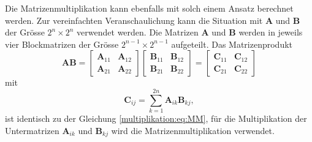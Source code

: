 Die Matrizenmultiplikation kann ebenfalls mit solch einem Ansatz berechnet werden.
Zur vereinfachten Veranschaulichung kann die Situation mit $\mathbf{A}$ und $\mathbf{B}$ der Gr\"osse $2^n \times 2^n$ verwendet werden.
Die Matrizen $\mathbf{A}$ und $\mathbf{B}$ werden in jeweils vier Blockmatrizen der Gr\"osse $2^{n-1} \times 2^{n-1}$ aufgeteilt.
Das Matrizenprodukt
\begin{equation}
\mathbf{A}\mathbf{B}=
\begin{bmatrix}
\mathbf{A}_{11} & \mathbf{A}_{12}\\
\mathbf{A}_{21} & \mathbf{A}_{22}
\end{bmatrix}
\begin{bmatrix}
\mathbf{B}_{11} & \mathbf{B}_{12}\\
\mathbf{B}_{21} & \mathbf{B}_{22}
\end{bmatrix}
=
\begin{bmatrix}
\mathbf{C}_{11} & \mathbf{C}_{12}\\
\mathbf{C}_{21} & \mathbf{C}_{22}
\end{bmatrix}
\end{equation}
mit \begin{equation}
\mathbf{C}_{i\!j} = \sum_{k=1}^{2n} \mathbf{A}_{ik} \mathbf{B}_{k\!j},
\label{multiplikation:eq:MM_block}
\end{equation}
ist identisch zu der Gleichung \eqref{multiplikation:eq:MM}, f\"ur die Multiplikation der Untermatrizen $\mathbf{A}_{ik}$ und $\mathbf{B}_{k\!j}$ wird die Matrizenmultiplikation verwendet.

